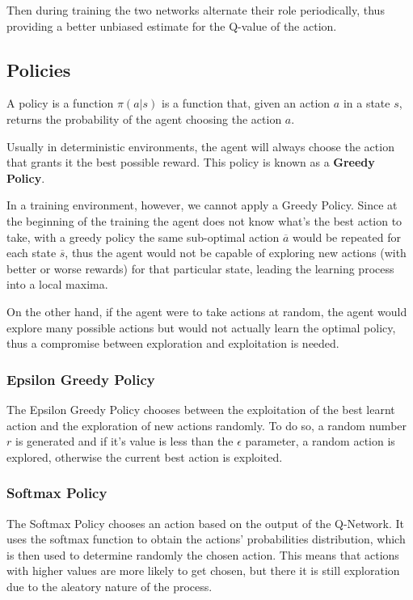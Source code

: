 \documentclass[13pt]{article}
\begin{document}
Then during training the two networks alternate their role periodically, thus providing a better unbiased estimate for the Q-value of the action.

\subsection{Policies}
A policy is a function $\pi(a | s)$ is a function that, given an action $a$ in a state $s$, returns the probability of the agent choosing the action $a$.

Usually in deterministic environments, the agent will always choose the action that grants it the best possible reward. This policy is known as a \textbf{Greedy Policy}.

In a training environment, however, we cannot apply a Greedy Policy. Since at the beginning of the training the agent does not know what's the best action to take, with a greedy policy the same sub-optimal action $\overline{a}$ would be repeated for each state $\overline{s}$, thus the agent would not be capable of exploring new actions (with better or worse rewards) for that particular state, leading the learning process into a local maxima.

On the other hand, if the agent were to take actions at random, the agent would explore many possible actions but would not actually learn the optimal policy, thus a compromise between exploration and exploitation is needed.

\subsubsection{Epsilon Greedy Policy}
The Epsilon Greedy Policy chooses between the exploitation of the best learnt action and the exploration of new actions randomly. To do so, a random number $r$ is generated and if it's value is less than the $\epsilon$ parameter, a random action is explored, otherwise the current best action is exploited.

\subsubsection{Softmax Policy}
The Softmax Policy 
chooses an action based on the output of the Q-Network. It uses the softmax function to obtain the actions' probabilities distribution, which is then used to determine randomly the chosen action. This means that actions with higher values are more likely to get chosen, but there it is still exploration due to the aleatory nature of the process.
\end{document}
